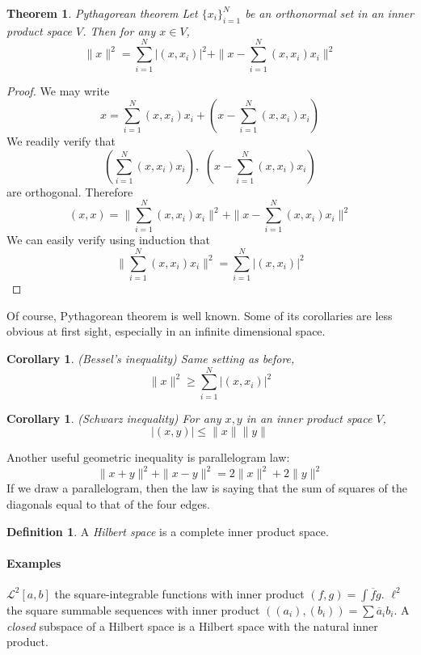 \documentclass[12pt]{article}
\theoremstyle{plain}
\newtheorem{theorem}[equation]{Theorem}
\newtheorem{corollary}[equation]{Corollary}
\theoremstyle{definition}
\newtheorem{definition}[equation]{Definition}
\theoremstyle{named}
\newcommand{\sL}{\mathcal{L}}
\newcommand{\<}{\langle}
\renewcommand{\>}{\rangle}
\begin{document}
\begin{theorem}
\emph{Pythagorean theorem}
Let $\{ x_i \}_{i = 1}^N$ be an orthonormal set in an inner product space $V$. Then for any $x \in V$, 
$$ \| x \|^2 = \sum_{i = 1}^N |(x, x_i)|^2 + \| x - \sum_{i = 1}^N (x, x_i)x_i \|^2 $$
\end{theorem}
\begin{proof}
We may write 
$$ x = \sum_{i = 1}^N (x, x_i)x_i + ( x  - \sum_{i = 1}^N (x, x_i)x_i ) $$
We readily verify that 
$$(\sum_{i = 1}^N (x, x_i)x_i), \, \, ( x  - \sum_{i = 1}^N (x, x_i)x_i ) $$
are orthogonal. Therefore 
$$(x, x) = \| \sum_{i = 1}^N (x, x_i)x_i \|^2 + \| x - \sum_{i = 1}^N (x, x_i)x_i \|^2 $$
We can easily verify using induction that $$\| \sum_{i = 1}^N (x, x_i)x_i \|^2 = \sum_{i = 1}^N |(x, x_i)|^2 $$
\end{proof}

Of course, Pythagorean theorem is well known. Some of its corollaries are less obvious at first sight, especially in an infinite dimensional space. 
\begin{corollary}
\emph{(Bessel's inequality)}
Same setting as before, 
$$  \| x \|^2 \ge \sum_{i = 1}^N |(x, x_i)|^2 $$ 
\end{corollary}


\begin{corollary}
\emph{(Schwarz inequality)}
For any $x, y$ in an inner product space $V$, 
$$ |(x, y)| \le \| x \| \| y \| $$ 
\end{corollary}

Another useful geometric inequality is parallelogram law:
$$\| x + y \|^2 + \| x - y \|^2 = 2 \|x \|^2 + 2 \|y \|^2 $$
If we draw a parallelogram, then the law is saying that the sum of squares of the diagonals equal to that of the four edges. 

\begin{definition}
A \textit{Hilbert space} is a complete inner product space. 
\end{definition}

\paragraph{Examples} $\sL^2[a, b]$ the square-integrable functions with inner product $(f, g) = \int \overline{f} g $. $\ell^2$ the square summable sequences with inner product $((a_i), (b_i)) = \sum \overline{a}_i b_i$. A \textit{closed} subspace of a Hilbert space is a Hilbert space with the natural inner product. 
\end{document}
